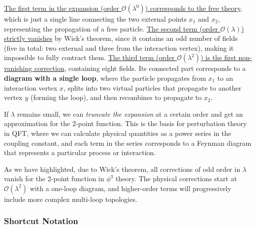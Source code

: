 \begin{example}
    \uline{The first term in the expansion (order \(\mathcal{O}(\lambda^0)\)) corresponds to the free theory}, which is just a single line connecting the two external points \(x_1\) and \(x_2\), representing the propagation of a free particle.
    \uline{The second term (order \(\mathcal{O}(\lambda)\)) strictly vanishes} by Wick's theorem, since it contains an odd number of fields (five in total: two external and three from the interaction vertex), making it impossible to fully contract them.
    \uline{The third term (order \(\mathcal{O}(\lambda^2)\)) is the first non-vanishing correction}, containing eight fields. Its connected part corresponds to a \textbf{diagram with a single loop}, where the particle propagates from \(x_1\) to an interaction vertex \(x\), splits into two virtual particles that propagate to another vertex \(y\) (forming the loop), and then recombines to propagate to \(x_2\).

    If \(\lambda\) remains small, we can \textit{truncate the expansion} at a certain order and get an approximation for the 2-point function. This is the basis for perturbation theory in QFT, where we can calculate physical quantities as a power series in the coupling constant, and each term in the series corresponds to a Feynman diagram that represents a particular process or interaction.

    As we have highlighted, due to Wick's theorem, all corrections of odd order in \(\lambda\) vanish for the 2-point function in \(\phi^3\) theory. The physical corrections start at \(\mathcal{O}(\lambda^2)\) with a one-loop diagram, and higher-order terms will progressively include more complex multi-loop topologies.
\end{example}

\subsubsection{Shortcut Notation}

